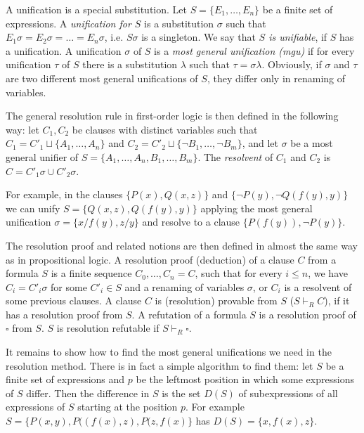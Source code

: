 A unification is a special substitution. Let $S = \{E_1, \dots, E_n\}$ be a finite set of expressions. A \emph{unification for $S$} is a substitution $\sigma$ such that $E_1 \sigma = E_2 \sigma = \dots = E_n \sigma$, i.e. $S \sigma$ is a singleton. We say that \emph{$S$ is unifiable}, if $S$ has a unification. A unification $\sigma$ of $S$ is a \emph{most general unification (mgu)} if for every unification $\tau$ of $S$ there is a substitution $\lambda$ such that $\tau = \sigma \lambda$. Obviously, if $\sigma$ and $\tau$ are two different most general unifications of $S$, they differ only in renaming of variables.

The general resolution rule in first-order logic is then defined in the following way: let $C_1, C_2$ be clauses with distinct variables such that $C_1 = C'_1 \sqcup \{A_1, \dots, A_n\}$ and $C_2 = C'_2 \sqcup \{\neg B_1, \dots, \neg B_m\}$, and let $\sigma$ be a most general unifier of $S = \{A_1, \dots, A_n, B_1, \dots, B_m\}$. The \emph{resolvent} of $C_1$ and $C_2$ is $C = C'_1 \sigma \cup C'_2 \sigma$.

For example, in the clauses $\{P(x), Q(x,z)\}$ and $\{\neg P(y), \neg Q(f(y), y)\}$ we can unify $S = \{Q(x,z), Q(f(y),y)\}$ applying the most general unification $\sigma = \{x/f(y), z/y\}$ and resolve to a clause $\{P(f(y)), \neg P(y)\}$.

The resolution proof and related notions are then defined in almost the same way as in propositional logic. A resolution proof (deduction) of a clause $C$ from a formula $S$ is a finite sequence $C_0, \dots, C_n = C$, such that for every $i \leq n$, we have $C_i = C'_i \sigma$ for some $C'_i \in S$ and a renaming of variables $\sigma$, or $C_i$ is a resolvent of some previous clauses. A clause $C$ is (resolution) provable from $S$ ($S \vdash_R C$), if it has a resolution proof from $S$. A refutation of a formula $S$ is a resolution proof of $\square$ from $S$. $S$ is resolution refutable if $S \vdash_R \square$.

It remains to show how to find the most general unifications we need in the resolution method. There is in fact a simple algorithm to find them: let $S$ be a finite set of expressions and $p$ be the leftmost position in which some expressions of $S$ differ. Then the difference in $S$ is the set $D(S)$ of subexpressions of all expressions of $S$ starting at the position $p$. For example $S = \{P(x,y), P((f(x), z), P(z, f(x)\}$ has $D(S) = \{x, f(x), z\}$.

